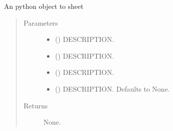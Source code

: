 \documentclass[letterpaper,10pt,english]{sphinxmanual}
\begin{document}
\begin{fulllineitems}
\label{\detokenize{onboard/model_Excel:model_Excel.obj_to_sheet}}
\pysigstartsignatures
{}
\pysigstopsignatures
\sphinxAtStartPar
An python object to sheet
\begin{quote}\begin{description}
\item[{Parameters}] \leavevmode\begin{itemize}
\item {} 
\sphinxAtStartPar
{} () \textendash{} DESCRIPTION.

\item {} 
\sphinxAtStartPar
{} () \textendash{} DESCRIPTION.

\item {} 
\sphinxAtStartPar
{} () \textendash{} DESCRIPTION.

\item {} 
\sphinxAtStartPar
{} (\sphinxstyleliteralemphasis{\sphinxupquote{, }}) \textendash{} DESCRIPTION. Defaults to None.

\end{itemize}

\item[{Returns}] \leavevmode
\sphinxAtStartPar
None.

\end{description}\end{quote}

\end{fulllineitems}

\end{document}
